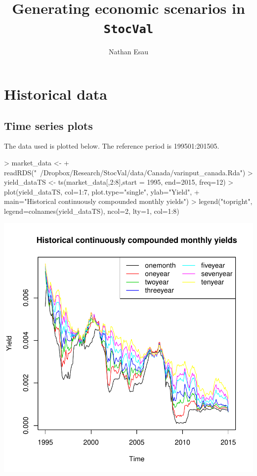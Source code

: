 \documentclass[11pt]{article}
\title{Generating economic scenarios in \texttt{StocVal}}
\author{Nathan Esau}
\date{}
\begin{document}


\maketitle

\section{Historical data}

\subsection{Time series plots}

The data used is plotted below. The reference period is 199501:201505.
\begin{Schunk}
\begin{Sinput}
> market_data <- 
+     readRDS("~/Dropbox/Research/StocVal/data/Canada/varinput_canada.Rda")
> yield_dataTS <- ts(market_data[,2:8],start = 1995, end=2015, freq=12)
> plot(yield_dataTS, col=1:7, plot.type="single", ylab="Yield", 
+     main="Historical continuously compounded monthly yields")
> legend("topright", legend=colnames(yield_dataTS), ncol=2, lty=1, col=1:8)
\end{Sinput}
\end{Schunk}
\includegraphics{var_canada_summary-001}
\end{document}
